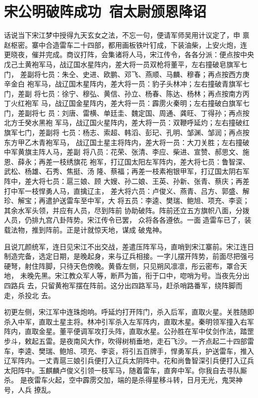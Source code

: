 \chapter{宋公明破阵成功~宿太尉颁恩降诏}

话说当下宋江梦中授得九天玄女之法，不忘一句，便请军师吴用计议定了，申
禀赵枢密。寨中合造雷车二十四部，都用画板铁叶钉成，下装油柴，上安火炮，连
更晓夜，催并完成。商议打阵，会集诸将人马，宋江传令，各各分派：便点按中央
戊己土黄袍军马，战辽国水星阵内，差大将一员双枪将董平，左右撞破皂旗军七门，
差副将七员：朱仝、史进、欧鹏、邓飞、燕顺、马麟、穆春；再点按西方庚辛金白
袍军马，战辽国木星阵内，差大将一员：豹子头林冲；左右撞破青旗军七门，差副
将七员：徐宁、穆弘、黄信、孙立、杨春、陈达、杨林；再点按南方丙丁火红袍军
马，战辽国金星阵内，差大将一员：霹雳火秦明；左右撞破白旗军七门，差副将七
员：刘唐、雷横、单廷圭、魏定国、周通、龚旺、丁得孙；再点按北方壬癸水黑袍
军马，战辽国火星阵内，差大将一员：双鞭呼延灼；左右撞破红旗军七门，差副将
七员：杨志、索超、韩滔、彭玘、孔明、邹渊、邹润；再点按东方甲乙木青袍军马，
战辽国土星主将阵内，差大将一员：大刀关胜；左右撞破中军黄旗主阵人马，差副
将八员：花荣、张清、李应、柴进、宣赞、郝思文、施恩、薛永；再差一枝绣旗花
袍军，打辽国太阳左军阵内，差大将七员：鲁智深、武松、杨雄、石秀、焦挺、汤
隆、蔡福；再差一枝素袍银甲军，打辽国太阴右军阵中，差大将七员：扈三娘、顾
大嫂、孙二娘、王英、孙新、张青、蔡庆；再差打中军一枝悍勇人马，直擒辽主，
差大将六员：卢俊义、燕青、吕方、郭盛、解珍、解宝；再遣护送雷车至中军，大
将五员：李逵、樊瑞、鲍旭、项充、李衮；其余水军头领，并应有人员，尽到阵前
协助破阵。阵前还立五方旗帜八面，分拨人员，仍排九宫八卦阵势。宋江传令已罢，
众将各各遵依。一面造雷车已了，装载法物，推到阵前。正是计就惊天地，谋成
破鬼神。

且说兀颜统军，连日见宋江不出交战，差遣压阵军马，直哨到宋江寨前。宋江连日
制造完备，选定日期，是晚起身，来与辽兵相接。一字儿摆开阵势，前面尽把强弓
硬弩，射住阵脚，只待天色傍晚。黄昏左侧，只见朔风凛凛，彤云密布，罩合天地，
未晚先黑。宋江教众军人等，断芦为笛，衔于口中，唿哨为号。当夜先分出四路兵
去，只留黄袍军摆在阵前。这分出四路军马，赶杀哨路番军，绕阵脚而走，杀投北
去。

初更左侧，宋江军中连珠炮响。呼延灼打开阵门，杀入后军，直取火星。关胜随即
杀入中军，直取土星主将。林冲引军杀入左军阵内，直取木星。秦明领军撞入右军
阵内，直取金星。董平便调军攻打头阵，直取水星。公孙胜在军中仗剑作法，踏罡
步斗，敕起五雷。是夜南风大作，吹得树梢垂地，走石飞沙。一齐点起二十四部雷
车，李逵、樊瑞、鲍旭、项充、李衮，将引五百牌手，悍勇军兵，护送雷车，推入
辽军阵内。一丈青扈三娘引兵便打入辽兵太阴阵中。花和尚鲁智深引兵便打入辽兵
太阳阵中。玉麒麟卢俊义引领一枝军马，随着雷车，直奔中军。你我自去寻队厮杀。
是夜雷车火起，空中霹雳交加，端的是杀得星移斗转，日月无光，鬼哭神号，人兵
撩乱。


